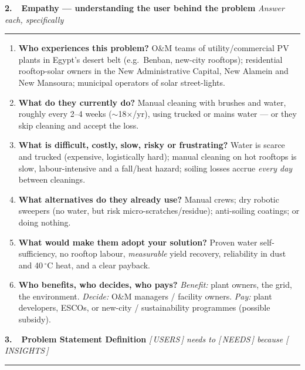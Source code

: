 \documentclass[11pt]{article}
\newcommand{\framehead}[2]{%
  \par\vspace{6pt}%
  {\color{slideblue}\large\bfseries #1}%
  \hfill{\color{inkgrey}\small\itshape #2}\par
  {\color{slideblue}\rule{\linewidth}{1.2pt}}\par\vspace{2pt}}
\begin{document}
\framehead{2.\ \ Empathy --- understanding the user behind the problem}{Answer each, specifically}

\begin{enumerate}[leftmargin=1.4em,itemsep=2pt]
\item \textbf{Who experiences this problem?} O\&M teams of utility/commercial PV plants
in Egypt's desert belt (e.g.\ Benban, new-city rooftops); residential rooftop-solar
owners in the New Administrative Capital, New Alamein and New Mansoura; municipal
operators of solar street-lights.
\item \textbf{What do they currently do?} Manual cleaning with brushes and water, roughly
every 2--4 weeks ($\sim$18$\times$/yr), using trucked or mains water --- or they skip
cleaning and accept the loss.
\item \textbf{What is difficult, costly, slow, risky or frustrating?} Water is scarce and
trucked (expensive, logistically hard); manual cleaning on hot rooftops is slow,
labour-intensive and a fall/heat hazard; soiling losses accrue \emph{every day} between
cleanings.
\item \textbf{What alternatives do they already use?} Manual crews; dry robotic sweepers
(no water, but risk micro-scratches/residue); anti-soiling coatings; or doing nothing.
\item \textbf{What would make them adopt your solution?} Proven water self-sufficiency,
no rooftop labour, \emph{measurable} yield recovery, reliability in dust and
40\,$^\circ$C heat, and a clear payback.
\item \textbf{Who benefits, who decides, who pays?}
\emph{Benefit:} plant owners, the grid, the environment.
\emph{Decide:} O\&M managers / facility owners.
\emph{Pay:} plant developers, ESCOs, or new-city / sustainability programmes
(possible subsidy).
\end{enumerate}

\framehead{3.\ \ Problem Statement Definition}{[\,USERS\,] needs to [\,NEEDS\,] because [\,INSIGHTS\,]}
\end{document}
